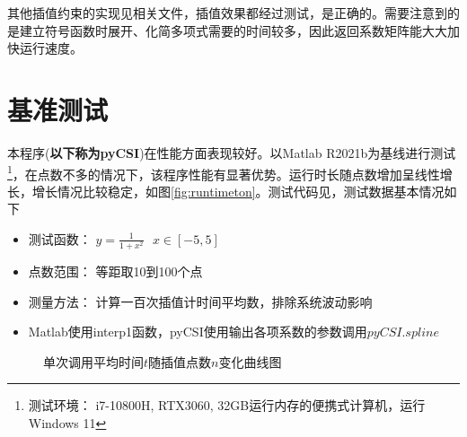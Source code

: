 \documentclass[a4paper,twoside]{article}
\begin{document}
\begin{spacing}{1.2}
其他插值约束的实现见相关文件，插值效果都经过测试，是正确的。需要注意到的是建立符号函数时展开、化简多项式需要的时间较多，因此返回系数矩阵能大大加快运行速度。

\section{基准测试}

本程序(\textbf{以下称为pyCSI})在性能方面表现较好。以Matlab R2021b为基线进行测试\footnote{测试环境： i7-10800H, RTX3060, 32GB运行内存的便携式计算机，运行Windows 11}，在点数不多的情况下，该程序性能有显著优势。运行时长随点数增加呈线性增长，增长情况比较稳定，如图\ref{fig:runtimeton}。测试代码见，测试数据基本情况如下

\begin{itemize}
	\item 测试函数： $y=\frac{1}{1+x^2} \ \ \ x \in [-5,5]$
	\item 点数范围： 等距取10到100个点
	\item 测量方法： 计算一百次插值计时间平均数，排除系统波动影响
	\item Matlab使用interp1函数，pyCSI使用输出各项系数的参数调用$pyCSI.spline$
\end{itemize}

\begin{figure}[h]
	\caption{单次调用平均时间$t$随插值点数$n$变化曲线图}
	

\end{figure}
\end{spacing}
\end{document}
